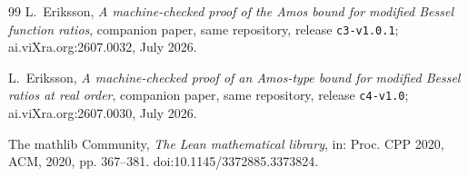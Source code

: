 \documentclass[11pt]{article}
\newcommand{\lean}[1]{\texttt{#1}}
\begin{document}
\begin{thebibliography}{99}
 L.~Eriksson,
\emph{A machine-checked proof of the Amos bound for modified Bessel
function ratios}, companion paper, same repository, release
\lean{c3-v1.0.1}; ai.viXra.org:2607.0032, July 2026.

 L.~Eriksson,
\emph{A machine-checked proof of an Amos-type bound for modified
Bessel ratios at real order}, companion paper, same repository,
release \lean{c4-v1.0}; ai.viXra.org:2607.0030, July 2026.

 The mathlib Community,
\emph{The Lean mathematical library}, in: Proc. CPP 2020, ACM, 2020,
pp. 367--381. doi:10.1145/3372885.3373824.

\end{thebibliography}
\end{document}
